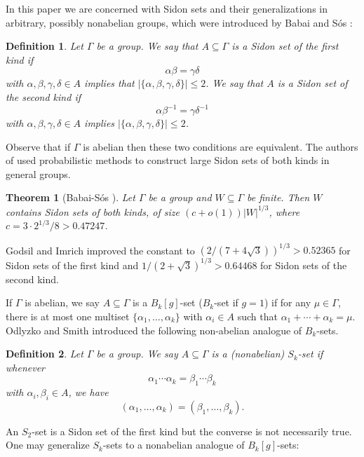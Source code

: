 \documentclass[12pt]{article}
\newtheorem{thm}{Theorem}
\newtheorem{defn}{Definition}
\begin{document}
In this paper we are concerned with Sidon sets and their generalizations in arbitrary, possibly nonabelian groups, which were introduced by Babai and S\'os \cite{babai1985sidon}:

\begin{defn}
    Let $\Gamma$ be a group. We say that $A\subseteq\Gamma$ is a \textit{Sidon set of the first kind} if
    $$\alpha\beta=\gamma\delta$$
    with $\alpha,\beta,\gamma,\delta\in A$ implies that $|\{\alpha,\beta,\gamma,\delta\}|\le 2$. We say that $A$ is a \textit{Sidon set of the second kind} if
    $$\alpha\beta^{-1}=\gamma\delta^{-1}$$
    with $\alpha,\beta,\gamma,\delta\in A$ implies $|\{\alpha,\beta,\gamma,\delta\}|\le 2$. 
\end{defn}

Observe that if $\Gamma$ is abelian then these two conditions are equivalent. The authors of \cite{babai1985sidon} used probabilistic methods to construct large Sidon sets of both kinds in general groups.

\begin{thm}[Babai-S\'os \cite{babai1985sidon}] \label{Babai Sos lower bound}
Let $\Gamma$ be a group and $W\subseteq\Gamma$ be finite. Then $W$ contains Sidon sets of both kinds, of size
$(c+o(1))|W|^{1/3}$, where $c=3\cdot2^{1/3}/8>0.47247$.
\end{thm}
Godsil and Imrich \cite{godsil1987embedding} improved the constant to $(2/(7+4\sqrt 3))^{1/3}> 0.52365$ for Sidon sets of the first kind and $1/(2+\sqrt 3)^{1/3}>0.64468$ for Sidon sets of the second kind.

If $\Gamma$ is abelian, we say $A\subseteq\Gamma$ is a $B_k[g]$-set ($B_k$-set if $g=1$) if for any $\mu\in\Gamma$, there is at most one multiset $\{\alpha_1,\ldots,\alpha_k\}$ with $\alpha_i\in A$ such that $\alpha_1+\cdots+\alpha_k=\mu$. Odlyzko and Smith \cite{odlyzko1995nonabelian} introduced the following non-abelian analogue of $B_k$-sets.

\begin{defn}
    Let $\Gamma$ be a group. We say $A\subseteq\Gamma$ is a (nonabelian) $S_k$-set if whenever $$\alpha_1\cdots\alpha_k=\beta_1\cdots\beta_k$$
    with $\alpha_i,\beta_i\in A$, we have
    $$(\alpha_1,\ldots,\alpha_k)=(\beta_1,\ldots,\beta_k).$$
\end{defn}

An $S_2$-set is a Sidon set of the first kind but the converse is not  necessarily true. One may generalize $S_k$-sets to a nonabelian analogue of $B_k[g]$-sets:
\end{document}
